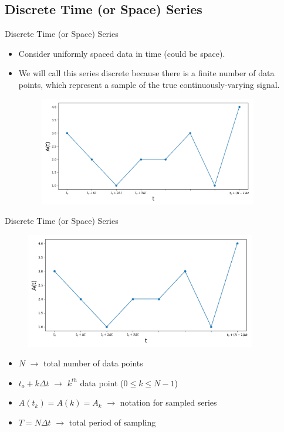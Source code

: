 \subsection{Discrete Time (or Space) Series} %
\begin{frame}{Discrete Time (or Space) Series}

\begin{itemize}
	\item Consider uniformly spaced data in time (could be space).
	\item We will call this series discrete because there is a finite number of data points, which represent a sample of the true continuously-varying signal.
	\begin{figure}
		\includegraphics[width=0.9\textwidth]{discrete1}
	\end{figure}
\end{itemize}
\end{frame}
\begin{frame}{Discrete Time (or Space) Series}

\begin{figure}
		\includegraphics[width=0.9\textwidth]{discrete1}
	\end{figure}
	
\begin{itemize}
	\item $N$ $\rightarrow$ total number of data points
	\item $t_o+k\Delta t$ $\rightarrow$ $k^{th}$ data point ($0\leq k \leq N-1$)
	\item $A(t_k) = A(k) = A_k$ $\rightarrow$ notation for sampled series
	\item $T = N\Delta t$ $\rightarrow$ total period of sampling
\end{itemize}
\end{frame}

